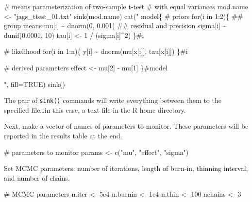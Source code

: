 \documentclass[
  13,
  letterpaper,
]{report}
\newenvironment{Shaded}{\begin{snugshade}}{\end{snugshade}}
\newcommand{\AttributeTok}[1]{\textcolor[rgb]{0.40,0.45,0.13}{#1}}
\newcommand{\CommentTok}[1]{\textcolor[rgb]{0.37,0.37,0.37}{#1}}
\newcommand{\ConstantTok}[1]{\textcolor[rgb]{0.56,0.35,0.01}{#1}}
\newcommand{\DecValTok}[1]{\textcolor[rgb]{0.68,0.00,0.00}{#1}}
\newcommand{\FloatTok}[1]{\textcolor[rgb]{0.68,0.00,0.00}{#1}}
\newcommand{\FunctionTok}[1]{\textcolor[rgb]{0.28,0.35,0.67}{#1}}
\newcommand{\NormalTok}[1]{\textcolor[rgb]{0.00,0.23,0.31}{#1}}
\newcommand{\OtherTok}[1]{\textcolor[rgb]{0.00,0.23,0.31}{#1}}
\newcommand{\StringTok}[1]{\textcolor[rgb]{0.13,0.47,0.30}{#1}}
\begin{document}
\begin{Shaded}
\begin{Highlighting}[]
\CommentTok{\# means parameterization of two{-}sample t{-}test}
\CommentTok{\# with equal variances}
\NormalTok{mod.name }\OtherTok{\textless{}{-}} \StringTok{"jags\_ttest\_01.txt"}
\FunctionTok{sink}\NormalTok{(mod.name)}
\FunctionTok{cat}\NormalTok{(}\StringTok{"}
\StringTok{    model\{}
\StringTok{        \# priors}
\StringTok{        }
\StringTok{        for(i in 1:2)\{}
\StringTok{            \#\# group means}
\StringTok{            mu[i] \textasciitilde{} dnorm(0, 0.001)}
\StringTok{            \#\# residual and precision}
\StringTok{            sigma[i] \textasciitilde{} dunif(0.0001, 10)}
\StringTok{            tau[i] \textless{}{-} 1 / (sigma[i]\^{}2)}
\StringTok{        \}\#i}

\StringTok{        \# likelihood}
\StringTok{        for(i in 1:n)\{}
\StringTok{            y[i] \textasciitilde{} dnorm(mu[x[i]], tau[x[i]])}
\StringTok{        \}\#i}

\StringTok{        \# derived parameters}
\StringTok{        effect \textless{}{-} mu[2] {-} mu[1]}
\StringTok{    \}\#model}

\StringTok{"}\NormalTok{, }\AttributeTok{fill=}\ConstantTok{TRUE}\NormalTok{)}
\FunctionTok{sink}\NormalTok{()}
\end{Highlighting}
\end{Shaded}

The pair of \texttt{sink()} commands will write everything between them
to the specified file\ldots in this case, a text file in the R home
directory.

Next, make a vector of names of parameters to monitor. These parameters
will be reported in the results table at the end.

\begin{Shaded}
\begin{Highlighting}[]
\CommentTok{\# parameters to monitor}
\NormalTok{params }\OtherTok{\textless{}{-}} \FunctionTok{c}\NormalTok{(}\StringTok{"mu"}\NormalTok{, }\StringTok{"effect"}\NormalTok{, }\StringTok{"sigma"}\NormalTok{)}
\end{Highlighting}
\end{Shaded}

Set MCMC parameters: number of iterations, length of burn-in, thinning
interval, and number of chains.

\begin{Shaded}
\begin{Highlighting}[]
\CommentTok{\# MCMC parameters}
\NormalTok{n.iter }\OtherTok{\textless{}{-}} \FloatTok{5e4}
\NormalTok{n.burnin }\OtherTok{\textless{}{-}} \FloatTok{1e4}
\NormalTok{n.thin }\OtherTok{\textless{}{-}} \DecValTok{100}
\NormalTok{nchains }\OtherTok{\textless{}{-}} \DecValTok{3}
\end{Highlighting}
\end{Shaded}
\end{document}
